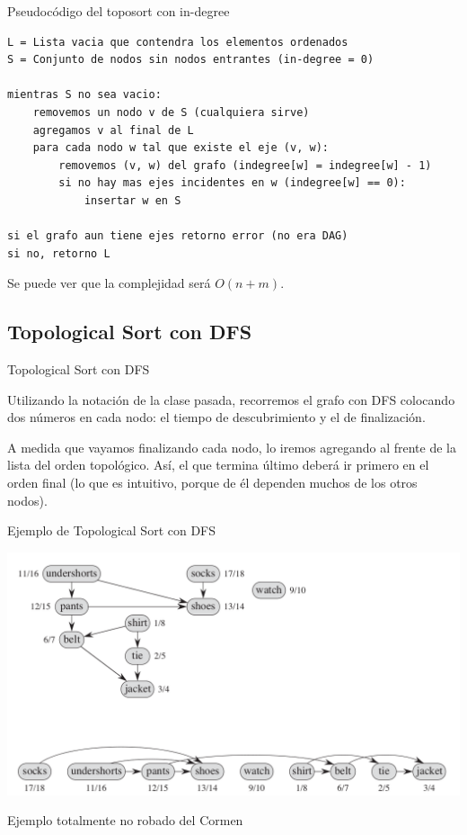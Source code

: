 \documentclass[compress]{beamer}
\begin{document}
\begin{frame}[fragile]{Pseudocódigo del toposort con in-degree}

\begin{lstlisting}
L = Lista vacia que contendra los elementos ordenados
S = Conjunto de nodos sin nodos entrantes (in-degree = 0)

mientras S no sea vacio:
    removemos un nodo v de S (cualquiera sirve)
    agregamos v al final de L
    para cada nodo w tal que existe el eje (v, w):
        removemos (v, w) del grafo (indegree[w] = indegree[w] - 1)
        si no hay mas ejes incidentes en w (indegree[w] == 0):
            insertar w en S
            
si el grafo aun tiene ejes retorno error (no era DAG)
si no, retorno L
\end{lstlisting}

Se puede ver que la complejidad será $O(n+m)$.
\end{frame}

\subsection{Topological Sort con DFS}
\begin{frame}{Topological Sort con DFS}

Utilizando la notación de la clase pasada, recorremos el grafo con DFS
colocando dos números en cada nodo: el tiempo de descubrimiento y el de
finalización. \\
\bigskip

A medida que vayamos finalizando cada nodo, lo iremos agregando al frente
de la lista del orden topológico. Así, el que termina último deberá ir
primero en el orden final (lo que es intuitivo, porque de él dependen
muchos de los otros nodos).
\end{frame}

\begin{frame}{Ejemplo de Topological Sort con DFS}
\begin{center}
\includegraphics[width=0.9\linewidth]{toposort-dfs.png}
\end{center}

\begin{flushright}
\tiny Ejemplo totalmente no robado del Cormen
\end{flushright}

\end{frame}
\end{document}
